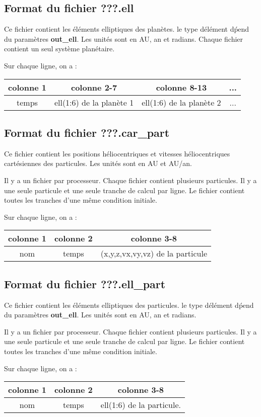 \documentclass[11pt]{article}
\begin{document}
\subsection{Format du fichier {\bf ???.ell} }

Ce fichier contient les \'el\'ements elliptiques des plan\`etes. le type d\'el\'ement d\'pend du param\`etres  {\bf out\_ell}. Les unit\'es sont en AU, an et radians.
Chaque fichier contient un seul syst\`eme plan\'etaire.

Sur chaque ligne, on a : 

\begin{tabular}{|c|c|c|c|} \hline
colonne 1 &   colonne 2-7 & colonne 8-13 & ... \\ \hline
temps & ell(1:6) de la plan\`ete 1  & ell(1:6) de la plan\`ete 2 & ... \\    \hline
\end{tabular}

\subsection{Format du fichier {\bf ???.car\_part} }

Ce fichier contient les positions h\'eliocentriques et vitesses h\'eliocentriques cart\'esiennes des particules. Les unit\'es sont en AU et AU/an.

 Il y a un fichier par processeur. Chaque fichier contient plusieurs particules.  Il y a une seule particule et une seule tranche de calcul  par ligne. Le fichier contient toutes les tranches d'une m\^eme  condition initiale.


Sur chaque ligne, on a : 

\begin{tabular}{|c|c|c|} \hline
colonne 1 &   colonne 2 & colonne 3-8\\ \hline
nom & temps & (x,y,z,vx,vy,vz) de la particule  \\    \hline
\end{tabular}

\subsection{Format du fichier {\bf ???.ell\_part} }

Ce fichier contient les \'el\'ements elliptiques des particules. le type d\'el\'ement d\'pend du param\`etres  {\bf out\_ell}. Les unit\'es sont en AU, an et radians.

 Il y a un fichier par processeur. Chaque fichier contient plusieurs particules.  Il y a une seule particule et une seule tranche de calcul  par ligne. Le fichier contient toutes les tranches d'une m\^eme  condition initiale.

Sur chaque ligne, on a : 

\begin{tabular}{|c|c|c|} \hline
colonne 1 &   colonne 2 & colonne 3-8\\ \hline
nom &  temps & ell(1:6) de la particule. \\    \hline
\end{tabular}
\end{document}

